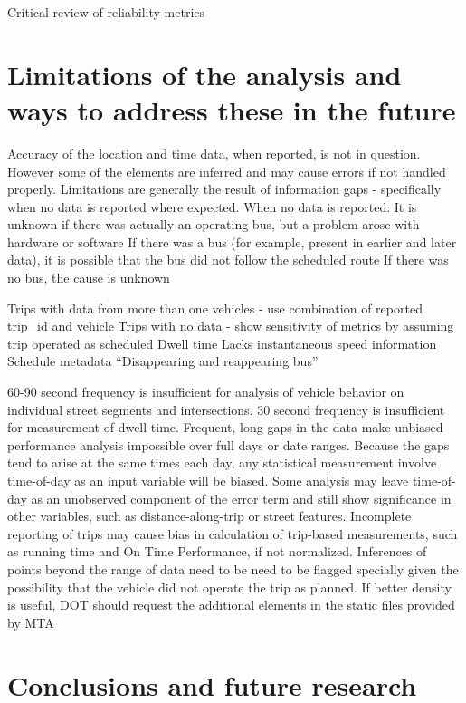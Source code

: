 \documentclass[12pt,journal,compsoc]{IEEEtran}
\begin{document}






Critical review of reliability metrics



\section{Limitations of the analysis and ways to address these in the future}
Accuracy of the location and time data, when reported, is not in question. However some of the elements are inferred and may cause errors if not handled properly.
Limitations are generally the result of information gaps - specifically when no data is reported where expected.
When no data is reported:
It is unknown if there was actually an operating bus, but a problem arose with hardware or software
If there was a bus (for example, present in earlier and later data), it is possible that the bus did not follow the scheduled route
If there was no bus, the cause is unknown

Trips with data from more than one vehicles - use combination of reported trip\_id and vehicle
Trips with no data - show sensitivity of metrics by assuming trip operated as scheduled
Dwell time
Lacks instantaneous speed information
Schedule metadata
“Disappearing and reappearing bus” 

60-90 second frequency is insufficient for analysis of vehicle behavior on individual street segments and intersections.
30 second frequency is insufficient for measurement of dwell time.
Frequent, long gaps in the data make unbiased performance analysis impossible over full days or date ranges.  Because the gaps tend to arise at the same times each day, any statistical measurement involve time-of-day as an input variable will be biased.  Some analysis may leave time-of-day as an unobserved component of the error term and still show significance in other variables, such as distance-along-trip or street features.
Incomplete reporting of trips may cause bias in calculation of trip-based measurements, such as running time and On Time Performance, if not normalized.
Inferences of points beyond the range of data need to be need to be flagged specially given the possibility that the vehicle did not operate the trip as planned.
If better density is useful, DOT should request the additional elements in the static files provided by MTA


\section{Conclusions and future research}
\end{document}
